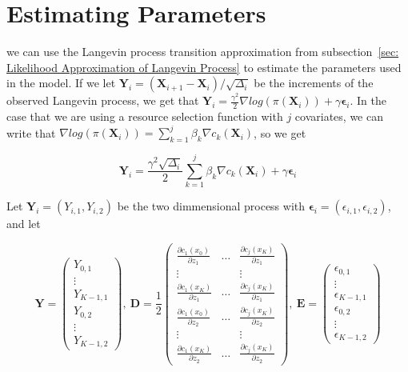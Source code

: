 \section{Estimating Parameters}
\label{sec: estimating parameters}
we can use the Langevin process transition approximation from subsection~\ref{sec: Likelihood Approximation of Langevin Process} to estimate the parameters used in the model. If we let $\textbf{Y}_i = (\textbf{X}_{i+1} - \textbf{X}_i)/\sqrt{\Delta_i}$ be the increments of the observed Langevin process, we get that $\textbf{Y}_i = \frac{\gamma^2}{2}\nabla log(\pi(\textbf{X}_i)) + \gamma \bm \epsilon_i$. In the case that we are using a resource selection function with $j$ covariates, we can write that $\nabla log(\pi(\textbf{X}_i)) = \sum_{k = 1}^j \beta_k \nabla c_k(\textbf{X}_i)$, so we get

$$
    \textbf{Y}_i = \frac{\gamma^2 \sqrt{\Delta_i}}{2}\sum_{k = 1}^j \beta_k \nabla c_k(\textbf{X}_i) + \gamma \bm \epsilon_i
$$

Let $\textbf{Y}_i = (Y_{i,1}, Y_{i,2})$ be the two dimmensional process with $\bm \epsilon_i =(\epsilon_{i,1}, \epsilon_{i,2})$, and let

$$
    \mathbf{Y} = \begin{pmatrix}
        Y_{0,1} \\
        \vdots \\
        Y_{K-1,1}\\
        Y_{0,2}\\
        \vdots\\
        Y_{K-1,2}
    \end{pmatrix} , \    
    \mathbf{D} = \frac{1}{2} 
    \begin{pmatrix}
        \frac{\partial c_1(x_0)}{\partial z_1} & \dots & \frac{\partial c_j(x_K)}{\partial z_1} \\
        \vdots & & \vdots \\
        \frac{\partial c_1(x_K)}{\partial z_1} & \dots & \frac{\partial c_j(x_K)}{\partial z_1} \\
        \frac{\partial c_1(x_0)}{\partial z_2} & \dots & \frac{\partial c_j(x_K)}{\partial z_2} \\
        \vdots & & \vdots \\
        \frac{\partial c_1(x_K)}{\partial z_2} & \dots & \frac{\partial c_j(x_K)}{\partial z_2}
    \end{pmatrix} , \
    \mathbf{E} =\begin{pmatrix}
        \epsilon_{0,1} \\
        \vdots \\
        \epsilon_{K-1,1}\\
        \epsilon_{0,2}\\
        \vdots\\
        \epsilon_{K-1,2}
    \end{pmatrix}
$$


